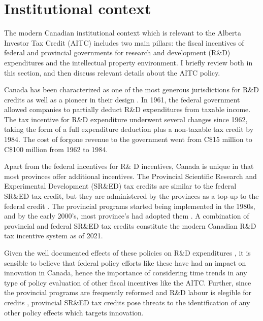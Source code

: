 \documentclass[../main.tex]{subfiles}
\begin{document}
\section{Institutional context}
\label{sec:institutional_background}

The modern Canadian institutional context which is relevant to the Alberta Investor Tax Credit (AITC) includes two main pillars: the fiscal incentives of federal and provincial governments for research and development (R\&D) expenditures and the intellectual property environment. I briefly review both in this section, and then discuss relevant details about the AITC policy.

Canada has been characterized as one of the most generous jurisdictions for R\&D credits \parencite{mckenzie08} as well as a pioneer in their design \parencite{mansfield_switzer85a}. In 1961, the federal government allowed companies to partially deduct R\&D expenditures from taxable income. The tax incentive for R\&D expenditure underwent several changes since 1962, taking the form of a full expenditure deduction plus a non-taxable tax credit by 1984. The cost of forgone revenue to the government went from C\$15 million to C\$100 million from 1962 to 1984. 

Apart from the federal incentives for R\& D incentives, Canada is unique in that most provinces offer additional incentives. The Provincial Scientific Research and Experimental Development (SR\&ED) tax credits are similar to the federal SR\&ED tax credit, but they are administered by the provinces as a top-up to the federal credit \parencite{warda00}. The provincial programs started being implemented in the 1980s, and by the early 2000's, most province's had adopted them \parencite{warda98,mckenzie05}. A combination of provincial and federal SR\&ED tax credits constitute the modern Canadian R\&D tax incentive system as of 2021.

Given the well documented effects of these policies on R\&D expenditures \parencite{becker15}, it is sensible to believe that federal policy efforts like these have had an impact on innovation in Canada, hence the importance of considering time trends in any type of policy evaluation of other fiscal incentives like the AITC. Further, since the provincial programs are frequently reformed and R\&D labour is elegible for credits \parencite{mckenzie05}, provincial SR\&ED tax credits pose threats to the identification of any other policy effects which targets innovation.
\end{document}
